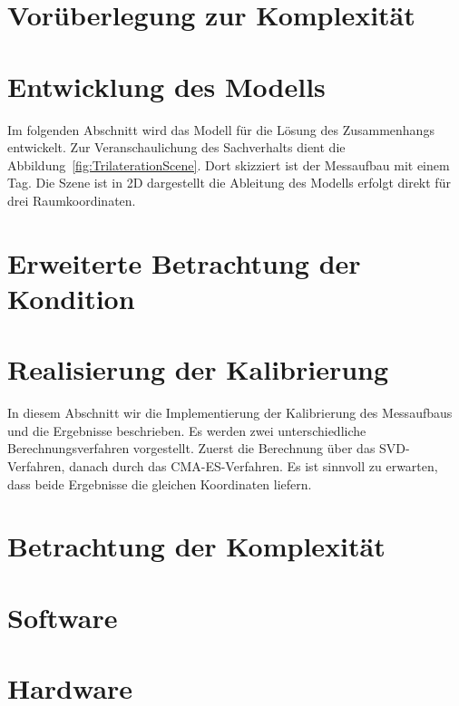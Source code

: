 \section{Vorüberlegung zur Komplexität}
\label{sec:Komplexity1}

%
\section{Entwicklung des Modells}
\label{sec:model_developement}
Im folgenden Abschnitt wird das Modell für die Lösung des Zusammenhangs entwickelt. Zur Veranschaulichung des Sachverhalts dient die Abbildung~\ref{fig:TrilaterationScene}. Dort skizziert ist der Messaufbau mit einem Tag. Die Szene ist in 2D dargestellt die Ableitung des Modells erfolgt direkt für drei Raumkoordinaten.
%

%

\section{Erweiterte Betrachtung der Kondition}

%
\section{Realisierung der Kalibrierung}
\label{sec:calibration}
In diesem Abschnitt wir die Implementierung der Kalibrierung des Messaufbaus und die Ergebnisse beschrieben. Es werden zwei unterschiedliche Berechnungsverfahren vorgestellt. Zuerst die Berechnung über das SVD-Verfahren, danach durch das CMA-ES-Verfahren. Es ist sinnvoll zu erwarten, dass beide Ergebnisse die gleichen Koordinaten liefern.

%
%
\section{Betrachtung der Komplexität}
\label{sec:Komplexity2}


\section{Software}
\label{sec:sw}
\lipsum[1-3]

\section{Hardware}
\label{sec:hw}
\lipsum[1-3]

